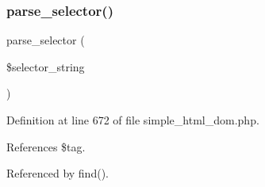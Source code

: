 \subsubsection{\texorpdfstring{parse\+\_\+selector()}{parse\_selector()}}
{\footnotesize\ttfamily parse\+\_\+selector (\begin{DoxyParamCaption}\item[{}]{\$selector\+\_\+string }\end{DoxyParamCaption})\hspace{0.3cm}{\ttfamily [protected]}}



Definition at line 672 of file simple\+\_\+html\+\_\+dom.\+php.



References \$tag.



Referenced by find().


